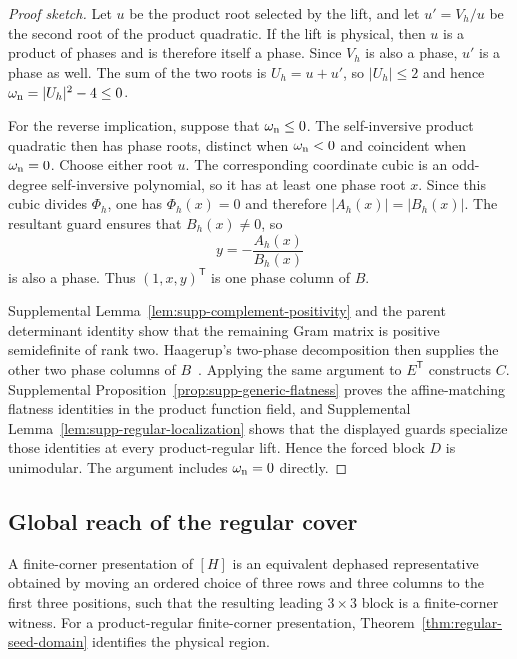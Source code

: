 \documentclass[aps,prx,reprint,nofootinbib,twoside,superscriptaddress,longbibliography,floatfix]{revtex4-2}
\theoremstyle{definition}
\begin{document}
\begin{proof}[Proof sketch]
Let $u$ be the product root selected by the lift, and let $u'=V_h/u$ be the second root of the product quadratic. If the lift is physical, then $u$ is a product of phases and is therefore itself a phase. Since $V_h$ is also a phase, $u'$ is a phase as well. The sum of the two roots is $U_h=u+u'$, so $|U_h|\leq2$ and hence $\omega_{\rm n}=|U_h|^2-4\leq0$.

For the reverse implication, suppose that $\omega_{\rm n}\leq0$. The self-inversive product quadratic then has phase roots, distinct when $\omega_{\rm n}<0$ and coincident when $\omega_{\rm n}=0$. Choose either root $u$. The corresponding coordinate cubic is an odd-degree self-inversive polynomial, so it has at least one phase root $x$. Since this cubic divides $\Phi_h$, one has $\Phi_h(x)=0$ and therefore $|A_h(x)|=|B_h(x)|$. The resultant guard ensures that $B_h(x)\neq0$, so
\begin{equation}
y=-\frac{A_h(x)}{B_h(x)}
\end{equation}
is also a phase. Thus $(1,x,y)^{\mathsf T}$ is one phase column of $B$.

Supplemental Lemma~\ref{lem:supp-complement-positivity} and the parent determinant identity show that the remaining Gram matrix is positive semidefinite of rank two. Haagerup's two-phase decomposition then supplies the other two phase columns of $B$~\cite{Haagerup1997,Szollosi2012FourParameter}. Applying the same argument to $E^{\mathsf T}$ constructs $C$. Supplemental Proposition~\ref{prop:supp-generic-flatness} proves the affine-matching flatness identities in the product function field, and Supplemental Lemma~\ref{lem:supp-regular-localization} shows that the displayed guards specialize those identities at every product-regular lift. Hence the forced block $D$ is unimodular. The argument includes $\omega_{\rm n}=0$ directly.
\end{proof}

\subsection{Global reach of the regular cover}
\label{subsec:global-reach-regular-cover}

A finite-corner presentation of $[H]$ is an equivalent dephased representative obtained by moving an ordered choice of three rows and three columns to the first three positions, such that the resulting leading $3\times3$ block is a finite-corner witness.
For a product-regular finite-corner presentation,
Theorem~\ref{thm:regular-seed-domain} identifies the physical region.
\end{document}
